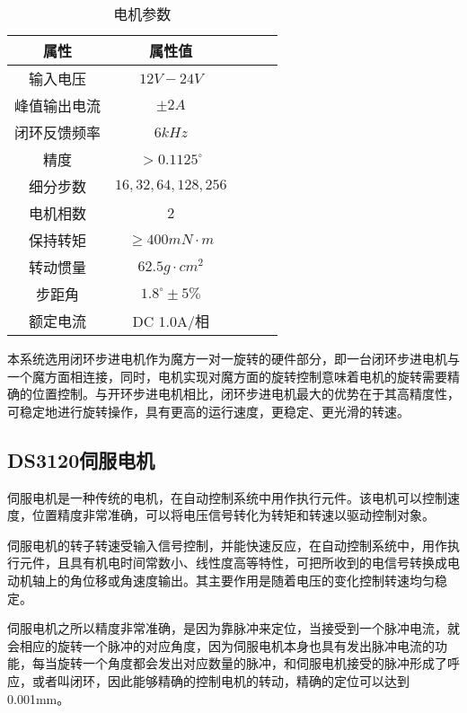 \begin{table}[H]
	\caption{电机参数}\label{tab:2-2}
	\vspace{0.5em}
	\begin{center}
		{\wuhao
			\begin{tabular}{ccccc}
				\toprule
				属性 & 属性值	\\
				\midrule
				输入电压 & $12V-24V$\\
				峰值输出电流 & $\pm2A$\\
				闭环反馈频率 & $6kHz$\\
				精度 & $> 0.1125 ^{\circ} $\\
				细分步数 & $16,32,64,128,256$\\
				电机相数 & $2$\\
				保持转矩 & $\ge400mN \cdot m$\\
				转动惯量 & $62.5g \cdot cm^2$\\
				步距角 & $1.8^{\circ} \pm 5\% $ \\
				额定电流 & DC 1.0A/相\\
				\bottomrule
		\end{tabular}}
	\end{center}
	\vspace{-1.5em}
\end{table}

本系统选用闭环步进电机作为魔方一对一旋转的硬件部分，即一台闭环步进电机与一个魔方面相连接，同时，电机实现对魔方面的旋转控制意味着电机的旋转需要精确的位置控制。与开环步进电机相比，闭环步进电机最大的优势在于其高精度性，可稳定地进行旋转操作，具有更高的运行速度，更稳定、更光滑的转速。

\subsection{DS3120伺服电机}
伺服电机是一种传统的电机，在自动控制系统中用作执行元件。该电机可以控制速度，位置精度非常准确，可以将电压信号转化为转矩和转速以驱动控制对象。

伺服电机的转子转速受输入信号控制，并能快速反应，在自动控制系统中，用作执行元件，且具有机电时间常数小、线性度高等特性，可把所收到的电信号转换成电动机轴上的角位移或角速度输出。其主要作用是随着电压的变化控制转速均匀稳定。

伺服电机之所以精度非常准确，是因为靠脉冲来定位，当接受到一个脉冲电流，就会相应的旋转一个脉冲的对应角度，因为伺服电机本身也具有发出脉冲电流的功能，每当旋转一个角度都会发出对应数量的脉冲，和伺服电机接受的脉冲形成了呼应，或者叫闭环，因此能够精确的控制电机的转动，精确的定位可以达到0.001mm。

